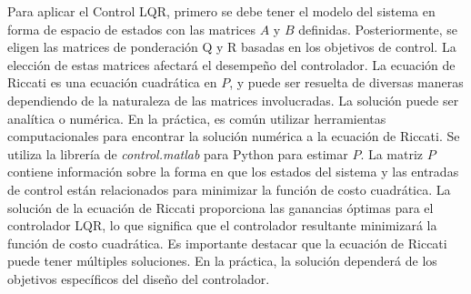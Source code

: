Para aplicar el Control LQR, primero se debe tener el modelo del sistema en forma de espacio de estados con las matrices $A$ y $B$ definidas.
%
Posteriormente, se eligen las matrices de ponderación Q y R basadas en los objetivos de control. La elección de estas matrices afectará el desempeño del controlador. 
%
La ecuación de Riccati es una ecuación cuadrática en $P$, y puede ser resuelta de diversas maneras dependiendo de la naturaleza de las matrices involucradas. La solución puede ser analítica o numérica. En la práctica, es común utilizar herramientas computacionales para encontrar la solución numérica a la ecuación de Riccati. 
%
Se utiliza la librería de \textit{control.matlab} para Python para estimar $P$. La matriz $P$ contiene información sobre la forma en que los estados del sistema y las entradas de control están relacionados para minimizar la función de costo cuadrática. 
%
La solución de la ecuación de Riccati proporciona las ganancias óptimas para el controlador LQR, lo que significa que el controlador resultante minimizará la función de costo cuadrática.
%
Es importante destacar que la ecuación de Riccati puede tener múltiples soluciones. En la práctica, la solución dependerá de los objetivos específicos del diseño del controlador. 

\medskip

